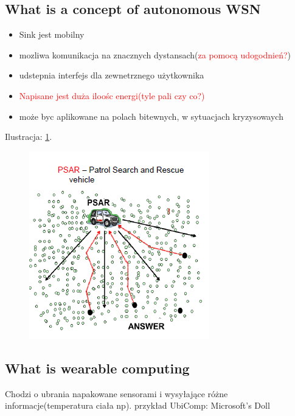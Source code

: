 \subsection{What is a concept of autonomous WSN}
\begin{itemize}
\item Sink jest mobilny
\item mozliwa komunikacja na znacznych dystansach(\textcolor{red}{za pomocą udogodnień?})
\item udstepnia interfejs dla zewnetrznego użytkownika
\item \textcolor{red}{Napisane jest duża iloośc energi(tyle pali czy co?)}

\item może byc aplikowane na polach bitewnych, w sytuacjach kryzysowaych 
\end{itemize}
Ilustracja: \ref{zdj:answer}.
\begin{figure}

\caption{}
\label{zdj:answer}
\centering
\includegraphics[width=\textwidth]{zdjecia/answer}
\end{figure}
\subsection{What is wearable computing}
Chodzi o ubrania napakowane sensorami i wysyłające różne informacje(temperatura ciała np). przykład UbiComp: Microsoft’s Doll
